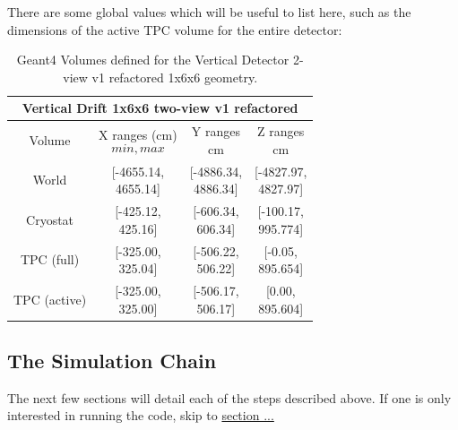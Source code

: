 \documentclass[8pt]{refart}
\begin{document}
There are some global values which will be useful to list here, such as the dimensions of the active TPC volume for the entire detector:
\begin{table}[H]
    \centering
    \begin{tabular}{|c|c|c|c|}
        \hline
        \multicolumn{4}{|c|}{\textbf{Vertical Drift 1x6x6 two-view v1 refactored}}\\
        \hline
        Volume & \makecell{X ranges (cm)\\ \[min,max\]} & \makecell{Y ranges\\cm} & \makecell{Z ranges\\cm}\\
        \hline
        \hline
        World & \makecell{[-4655.14,\\  4655.14]} & \makecell{[-4886.34,\\  4886.34]} & \makecell{[-4827.97,\\  4827.97]}\\
        \hline
        Cryostat &\makecell{[-425.12,\\  425.16]} & \makecell{[-606.34,\\  606.34]} & \makecell{[-100.17,\\  995.774]} \\
        \hline
        TPC (full) &\makecell{[-325.00,\\  325.04]} & \makecell{[-506.22,\\  506.22]} & \makecell{[-0.05,\\  895.654]} \\
        \hline
        TPC ({\color{red}active}) & \makecell{[-325.00,\\  325.00]} & \makecell{[-506.17,\\  506.17]} & \makecell{[0.00,\\  895.604]} \\
        \hline
    \end{tabular}
    \caption{Geant4 Volumes defined for the Vertical Detector 2-view v1 refactored 1x6x6 geometry.}
    \label{tab:my_label}
\end{table}

\subsection{The Simulation Chain}

The next few sections will detail each of the steps described above.  If one is only interested in running the code, skip to \hyperref[runningthecode]{section ...}  
\end{document}
